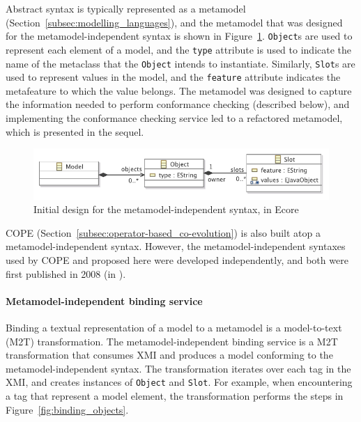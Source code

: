Abstract syntax is typically represented as a metamodel (Section~\ref{subsec:modelling_languages}), and the metamodel that was designed for the metamodel-independent syntax is shown in Figure~\ref{fig:mmi_syntax_design}. \texttt{Ob\-je\-ct}s are used to represent each element of a model, and the \texttt{ty\-pe} attribute is used to indicate the name of the metaclass that the \texttt{Ob\-je\-ct} intends to instantiate. Similarly, \texttt{Sl\-ot}s are used to represent values in the model, and the \texttt{feature} attribute indicates the metafeature to which the value belongs. The metamodel was designed to capture the information needed to perform conformance checking (described below), and implementing the conformance checking service led to a refactored metamodel, which is presented in the sequel.

\begin{figure}[htbp]
  \centering
  \includegraphics[width=12cm]{5.Implementation/images/slot_model_design.pdf}
  \caption{Initial design for the metamodel-independent syntax, in Ecore}
  \label{fig:mmi_syntax_design}
\end{figure}

COPE (Section~\ref{subsec:operator-based_co-evolution}) is also built atop a metamodel-independent syntax. However, the metamodel-independent syntaxes used by COPE and proposed here were developed independently, and both were first published in 2008 (in \cite{rose08hutn,herrmannsdoerfer08cope}).

\paragraph{Metamodel-independent binding service} Binding a textual representation of a model to a metamodel is a model-to-text (M2T) transformation. The metamodel-independent binding service is a M2T transformation that consumes XMI and produces a model conforming to the metamodel-independent syntax. The transformation iterates over each tag in the XMI, and creates instances of \texttt{Ob\-je\-ct} and \texttt{Sl\-ot}. For example, when encountering a tag that represent a model element, the transformation performs the steps in Figure~\ref{fig:binding_objects}.

